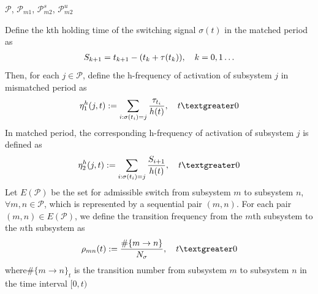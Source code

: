 \documentclass[twocolumn]{autart}    %
\begin{document}
\begin{rmk}
    $\mathcal{P}$, $\mathcal{P}_{m1}$, $\mathcal{P}_{m2}^{s}$, $\mathcal{P}_{m2}^{u}$
\end{rmk}


\begin{defn}
    
    Define the kth holding time of the switching
    signal $\sigma(t)$ in the matched period as
    \begin{equation}
        \begin{aligned}
            \setlength{\arraycolsep}{0.9pt}
            S_{k+1} = t_{k+1} - (t_{k}+\tau(t_{k})), \quad k = 0,1\ldots 
        \end{aligned}
    \end{equation}
    Then, for each $j \in \mathcal{P}$, define the h-frequency of activation of subsystem $j$ in mismatched period as
    \begin{equation}
        \begin{aligned}
            \setlength{\arraycolsep}{0.9pt}
            \eta^{h}_{1}(j,t) := \sum_{i:\sigma(t_{i}) = j}\frac{\tau_{t_{i}}}{h(t)}, \quad t\textgreater 0
        \end{aligned}
    \end{equation}
    In matched period, the corresponding h-frequency of activation of subsystem $j$ is defined as
    \begin{equation}
        \begin{aligned}
            \setlength{\arraycolsep}{0.9pt}
            \eta^{h}_{2}(j,t) := \sum_{i:\sigma(t_{i}) = j}\frac{S_{i+1}}{h(t)}, \quad t\textgreater 0
        \end{aligned}
    \end{equation}
    Let $E(\mathcal{P})$ be the set for admissible switch from subsystem $m$ to subsystem $n$, $\forall m, n \in \mathcal{P}$, which is represented by a
    sequential pair $(m,n)$. For each pair $(m,n) \in E(\mathcal{P})$, we define the transition frequency from the $m$th subsystem to the $n$th
    subsystem as
    \begin{equation}
        \begin{aligned}
            \setlength{\arraycolsep}{0.9pt}
            \rho_{mn}(t) := \frac{\# \{m \rightarrow n\}}{N_{\sigma}} , \quad t \textgreater 0
        \end{aligned}
    \end{equation}
    where$\# \{m\rightarrow n\}_{t}$ is the transition number from subsystem $m$ to subsystem $n$ in the time interval $[0,t)$
    

\end{defn}
\end{document}

